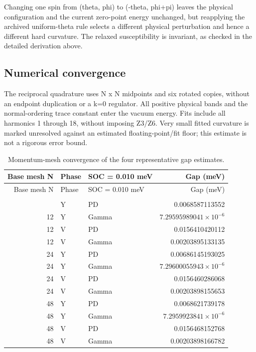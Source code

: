 Changing one spin from (theta, phi) to (-theta, phi+pi) leaves the
physical configuration and the current zero-point energy unchanged, but
reapplying the archived uniform-theta rule selects a different physical
perturbation and hence a different hard curvature. The relaxed
susceptibility is invariant, as checked in the detailed derivation
above.

\clearpage

\subsection{Numerical convergence}\label{sec-convergence}

The reciprocal quadrature uses N x N midpoints and six rotated copies,
without an endpoint duplication or a k=0 regulator. All positive
physical bands and the normal-ordering trace constant enter the vacuum
energy. Fits include all harmonics 1 through 18, without imposing Z3/Z6.
Very small fitted curvature is marked unresolved against an estimated
floating-point/fit floor; this estimate is not a rigorous error bound.

\begin{longtable}[]{@{}rllr@{}}
\toprule\noalign{}
Base mesh N & Phase & SOC = 0.010 meV & Gap (meV) \\
\midrule\noalign{}
\endfirsthead
\toprule\noalign{}
Base mesh N & Phase & SOC = 0.010 meV & Gap (meV) \\
\midrule\noalign{}
\endhead
\bottomrule\noalign{}
\caption{Momentum-mesh convergence of the four representative gap estimates.}\label{tab-nbcp-d-numerical-verification-2}\\
\endlastfoot
12 & Y & PD & 0.0068587113552 \\
12 & Y & Gamma & \(7.29595989041\times10^{-6}\) \\
12 & V & PD & 0.0156410420112 \\
12 & V & Gamma & 0.00203895133135 \\
24 & Y & PD & 0.00686145193025 \\
24 & Y & Gamma & \(7.29600055943\times10^{-6}\) \\
24 & V & PD & 0.0156460286068 \\
24 & V & Gamma & 0.00203898155653 \\
48 & Y & PD & 0.0068621739178 \\
48 & Y & Gamma & \(7.2959923841\times10^{-6}\) \\
48 & V & PD & 0.0156468152768 \\
48 & V & Gamma & 0.00203898166782 \\
\end{longtable}


